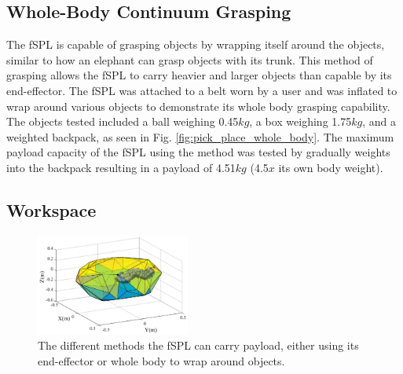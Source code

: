 \documentclass[letterpaper, 10 pt, conference]{ieeeconf}  %
\begin{document}




\subsection{Whole-Body Continuum Grasping}

The fSPL is capable of grasping objects by wrapping itself around the objects, similar to how an elephant can grasp objects with its trunk. This method of grasping allows the fSPL to carry heavier and larger objects than capable by its end-effector. The fSPL was attached to a belt worn by a user and was inflated to wrap around various objects to demonstrate its whole body grasping capability. The objects tested included a ball weighing 0.45$kg$, a box weighing 1.75$kg$, and a weighted backpack, as seen in Fig. \ref{fig:pick_place_whole_body}. The maximum payload capacity of the fSPL using the method was tested by gradually weights into the backpack resulting in a payload of 4.51$kg$ (4.5$x$ its own body weight).


\subsection{Workspace}
\begin{figure}[t!]
\centering
\includegraphics[width=0.45\textwidth]{Figures/Workspace_Fabric_ARM}
\caption{The different methods the fSPL can carry payload, either using its end-effector or whole body to wrap around objects.}
\label{fig:workspace_fabric_arm}
\vspace{-1.5em}
\end{figure}
\end{document}
